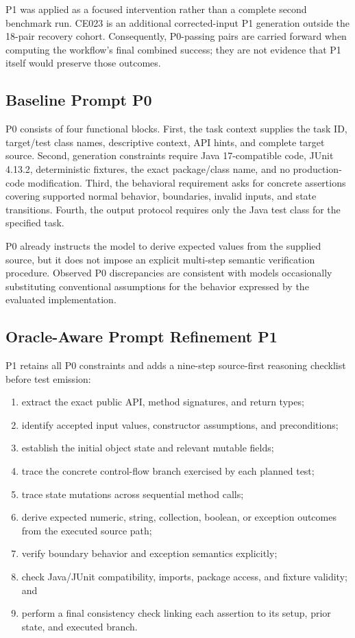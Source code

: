 \documentclass[conference]{IEEEtran}
\begin{document}
P1 was applied as a focused intervention rather than a complete second benchmark run. CE023 is an additional corrected-input P1 generation outside the 18-pair recovery cohort. Consequently, P0-passing pairs are carried forward when computing the workflow's final combined success; they are not evidence that P1 itself would preserve those outcomes.

\subsection{Baseline Prompt P0}
P0 consists of four functional blocks. First, the task context supplies the task ID, target/test class names, descriptive context, API hints, and complete target source. Second, generation constraints require Java 17-compatible code, JUnit 4.13.2, deterministic fixtures, the exact package/class name, and no production-code modification. Third, the behavioral requirement asks for concrete assertions covering supported normal behavior, boundaries, invalid inputs, and state transitions. Fourth, the output protocol requires only the Java test class for the specified task.

P0 already instructs the model to derive expected values from the supplied source, but it does not impose an explicit multi-step semantic verification procedure. Observed P0 discrepancies are consistent with models occasionally substituting conventional assumptions for the behavior expressed by the evaluated implementation.

\subsection{Oracle-Aware Prompt Refinement P1}
P1 retains all P0 constraints and adds a nine-step source-first reasoning checklist before test emission:

\begin{enumerate}[leftmargin=*,nosep]
    \item extract the exact public API, method signatures, and return types;
    \item identify accepted input values, constructor assumptions, and preconditions;
    \item establish the initial object state and relevant mutable fields;
    \item trace the concrete control-flow branch exercised by each planned test;
    \item trace state mutations across sequential method calls;
    \item derive expected numeric, string, collection, boolean, or exception outcomes from the executed source path;
    \item verify boundary behavior and exception semantics explicitly;
    \item check Java/JUnit compatibility, imports, package access, and fixture validity; and
    \item perform a final consistency check linking each assertion to its setup, prior state, and executed branch.
\end{enumerate}
\end{document}
